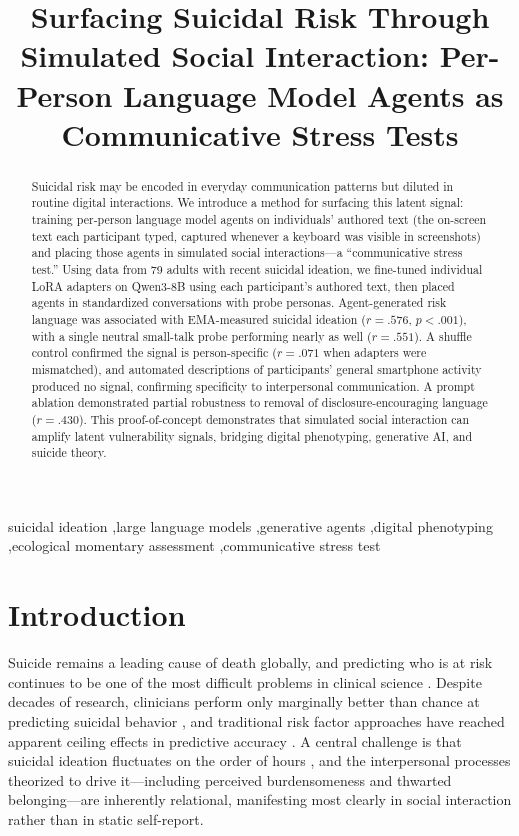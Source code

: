 \documentclass[review,12pt,authoryear]{elsarticle}
\begin{document}
\begin{frontmatter}

\title{Surfacing Suicidal Risk Through Simulated Social Interaction: Per-Person Language Model Agents as Communicative Stress Tests}


\begin{abstract}
Suicidal risk may be encoded in everyday communication patterns but diluted in routine digital interactions. We introduce a method for surfacing this latent signal: training per-person language model agents on individuals' authored text (the on-screen text each participant typed, captured whenever a keyboard was visible in screenshots) and placing those agents in simulated social interactions---a ``communicative stress test.'' Using data from 79 adults with recent suicidal ideation, we fine-tuned individual LoRA adapters on Qwen3-8B using each participant's authored text, then placed agents in standardized conversations with probe personas. Agent-generated risk language was associated with EMA-measured suicidal ideation ($r = .576$, $p < .001$), with a single neutral small-talk probe performing nearly as well ($r = .551$). A shuffle control confirmed the signal is person-specific ($r = .071$ when adapters were mismatched), and automated descriptions of participants' general smartphone activity produced no signal, confirming specificity to interpersonal communication. A prompt ablation demonstrated partial robustness to removal of disclosure-encouraging language ($r = .430$). This proof-of-concept demonstrates that simulated social interaction can amplify latent vulnerability signals, bridging digital phenotyping, generative AI, and suicide theory.
\end{abstract}

\begin{keyword}
suicidal ideation \sep large language models \sep generative agents \sep digital phenotyping \sep ecological momentary assessment \sep communicative stress test
\end{keyword}

\end{frontmatter}

\linenumbers

\section{Introduction}

Suicide remains a leading cause of death globally, and predicting who is at risk continues to be one of the most difficult problems in clinical science \citep{franklin2017risk}. Despite decades of research, clinicians perform only marginally better than chance at predicting suicidal behavior \citep{large2017meta}, and traditional risk factor approaches have reached apparent ceiling effects in predictive accuracy \citep{belsher2019prediction}. A central challenge is that suicidal ideation fluctuates on the order of hours \citep{kleiman2017examination}, and the interpersonal processes theorized to drive it---including perceived burdensomeness and thwarted belonging---are inherently relational, manifesting most clearly in social interaction rather than in static self-report.
\end{document}
